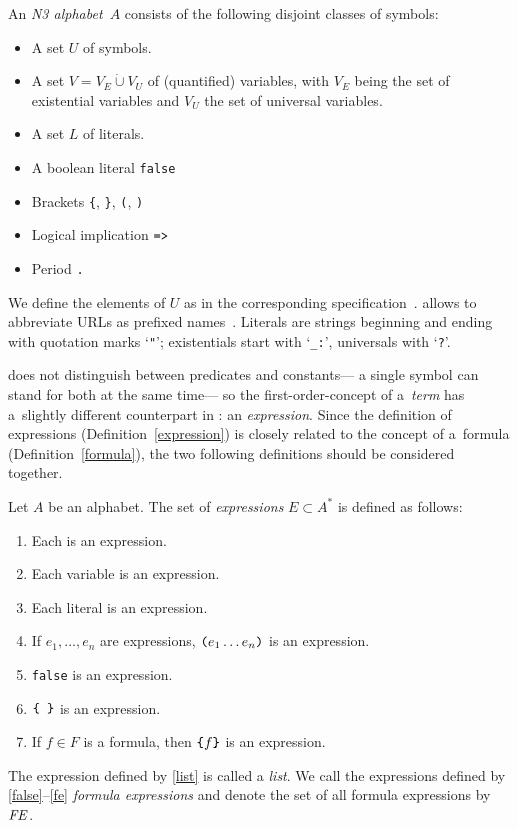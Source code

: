 \begin{definition}
An \emph{N3 alphabet~$A$} consists of the following disjoint classes of symbols:
\begin{itemize}
\item A set $U$ of \uri symbols.
\item A set $V=V_E\mathbin{\dot{\cup}} V_U$  of (quantified) variables, with $V_E$ being the set of existential variables
and $V_U$ the set of universal variables.
\item A set $L$  of literals.
\item A boolean literal \verb!false!
\item Brackets \verb!{!, \verb!}!, \verb!(!, \verb!)!
\item Logical implication $\verb!=>!$ 
\item Period \verb!.!
\end{itemize}
\end{definition}



We define the elements of $U$ as in the corresponding specification~\cite{iri}.
\nthree allows to abbreviate URLs as prefixed names~\cite{turtle}.
Literals are strings beginning and ending with quotation marks `\verb!"!';
existentials start with `\verb!_:!', universals with `\verb!?!'.

\nthree does not distinguish between predicates and constants---%
a single \uri symbol can stand for both at the same time---%
so the first-order-concept of a~\emph{term}
has a~slightly different counterpart in \nthree: an \emph{expression}.
Since the definition of expressions (Definition~\ref{expression})
is closely related to the concept of a~formula (Definition~\ref{formula}),
the two following definitions should be considered together.

\begin{definition}[Expressions]\label{expression}
  Let $A$ be an \nthree alphabet.
  The set of \textit{expressions} $E \subset A^{*}$ is
  defined as follows:
  \begin{enumerate}
    \item Each \uri is an expression.
    \item Each variable is an expression.
    \item Each literal is an expression.
    \item \label{list} If $e_1,\ldots,e_n$ are expressions, $\verb!(!e_1 \ldots e_n\verb!)!$ is an expression. 
    \item \label{false} \verb!false! is an expression.
    \item $\verb!{ }!$ is an expression.
    \item \label{fe} If $f\in F$ is a formula, then $\verb!{!f\verb!}!$ is an expression. 
  \end{enumerate}
  The expression defined by \ref{list} is called a \textit{list}.
  We call the expressions defined by \ref{false}--\ref{fe}
  \textit{formula expressions} and denote the set of all formula expressions by $\mbox{\textit{FE}}$.
\end{definition}


